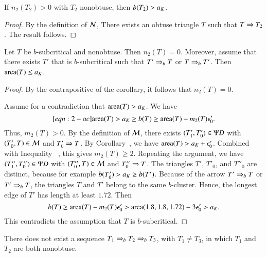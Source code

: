 \begin{corollary} If $n_2(T_2)>0$  with $T_2$ nonobtuse, then $b(T_2) > a_K$.
\end{corollary}  

\begin{proof}  By the definition of $\mathcal N$, There exists an obtuse triangle $T$ such that $T\Rightarrow T_2$.
The result follows.
\end{proof}

\begin{lemma}  Let $T$ be $b$-subcritical and nonobtuse.
Then $n_2(T)=0$.  Moreover, assume that there exists $T'$ that is $b$-subcritical
such that $T'\Rightarrow_{b} T$ or $T\Rightarrow_{b} T'$.  Then  ${\operatorname{area}}(T)\le a_K$.
\end{lemma}

\begin{proof}  
By the contrapositive of the corollary, it follows that $n_2(T)=0$.

Assume for a contradiction that ${\operatorname{area}}(T) > a_K$.
We have
\begin{equation}\libel{eqn:2-ac}
\area(T) > \aK \ge b(T) \ge \area(T) - m_2(T) \epso'.
\end{equation}
Thus, $m_2(T) >0$.  
By the definition of $\mathcal M$, there exists  $(T'_1,T'_0)\in\Psi D$ with $(T'_0,T)\in\mathcal M$ and $T'_0\Rightarrow T$.
By Corollary~, we have ${\operatorname{area}}(T) > a_K+\epsilon_0'$. Combined with
Inequality ~, this gives $m_2(T)\ge 2$.
Repeating the argument, we have $(T''_1,T''_0)\in \Psi D$ with $(T''_0,T)\in \mathcal M$ and $T''_0\Rightarrow T$.
The triangles $T'$, $T'_0$, and $T''_0$ are distinct, because for example $b(T'_0) > a_K \ge b(T')$.  
Because of the arrow $T'\Rightarrow_{b} T$ or $T'\Rightarrow_{b} T$, the triangles $T$ and $T'$ belong to the same $b$-cluster.
Hence, the longest edge of $T'$ has length at least $1.72$.
Then
\[
b(T) \ge {\operatorname{area}}(T) - m_2(T)\epsilon_0' > {\operatorname{area}}(1.8,1.8,1.72) - 3\epsilon_0' > a_K.
\]
This  contradicts the assumption that $T$ is $b$-subcritical.
\end{proof}

\begin{lemma}  There does not exist a sequence
$T_1\Rightarrow_{b} T_2 \Rightarrow_{b} T_3$, with $T_1\ne T_3$, in which $T_1$ and $T_2$  are
both nonobtuse.
\end{lemma}

